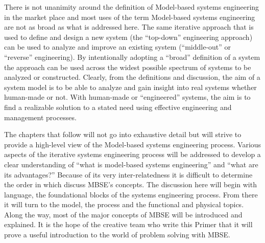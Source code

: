There is not unanimity around the definition of Model-based systems engineering in the market place and most uses of the term Model-based systems engineering are not as broad as what is addressed here. The same iterative approach that is used to define and design a new system (the ``top-down'' engineering approach) can be used to analyze and improve an existing system (``middle-out'' or ``reverse'' engineering). By intentionally adopting a ``broad'' definition of a system the approach can be used across the widest possible spectrum of systems to be analyzed or constructed. Clearly, from the definitions and discussion, the aim of a system model is to be able to analyze and gain insight into real systems whether human-made or not. With human-made or ``engineered'' systems, the aim is to find a realizable solution to a stated need using effective engineering and management processes.

The chapters that follow will not go into exhaustive detail but will strive to provide a high-level view of the Model-based systems engineering process. Various aspects of the iterative systems engineering process will be addressed to develop a clear understanding of ``what is model-based systems engineering'' and ``what are its advantages?'' Because of its very inter-relatedness it is difficult to determine the order in which discuss MBSE’s concepts. The discussion here will begin with language, the foundational blocks of the systems engineering process. From there it will turn to the model, the process and the functional and physical topics. Along the way, most of the major concepts of MBSE will be introduced and explained. It is the hope of the creative team who write this Primer that it will prove a useful introduction to the world of problem solving with MBSE.


\begin{exercises}
    \begin{exercise}
    \label{sea-7-1}
    
    \end{exercise}
    \begin{solution}
    \end{solution}

\end{exercises}
